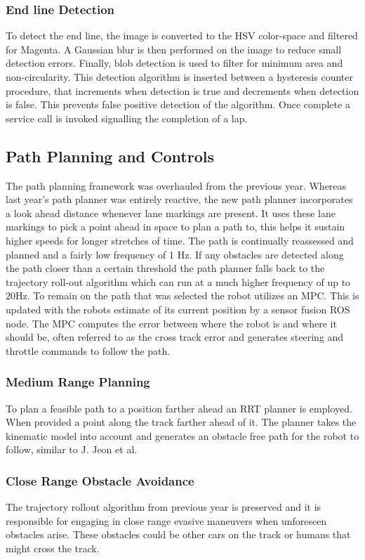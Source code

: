 \documentclass[11pt,journal]{IEEEtran}
\begin{document}
\subsubsection{End line Detection}
To detect the end line, the image is converted to the HSV color-space and filtered for Magenta. A Gaussian blur is then performed on the image to reduce small detection errors. Finally, blob detection is used to filter for minimum area and non-circularity. This detection algorithm is inserted between a hysteresis counter procedure, that increments when detection is true and decrements when detection is false. This prevents false positive detection of the algorithm. Once complete a service call is invoked signalling the completion of a lap.

\subsection{Path Planning and Controls}
The path planning framework was overhauled from the previous year. Whereas last year's path planner was entirely reactive, the new path planner incorporates a look ahead distance whenever lane markings are present. It uses these lane markings to pick a point ahead in space to plan a path to, this helps it sustain higher speeds for longer stretches of time. The path is continually reassessed and planned and a fairly low frequency of 1 Hz. If any obstacles are detected along the path closer than a certain threshold the path planner falls back to the trajectory roll-out algorithm which can run at a much higher frequency of up to 20Hz.
To remain on the path that was selected the robot utilizes an MPC. This is updated with the robots estimate of its current position by a sensor fusion ROS node. The MPC computes the error between where the robot is and where it should be, often referred to as the cross track error and generates steering and throttle commands to follow the path.

\subsubsection{Medium Range Planning}
To plan a feasible path to a position farther ahead an RRT planner is employed. When provided a point along the track farther ahead of it. The planner takes the kinematic model into account and generates an obstacle free path for the robot to follow, similar to J. Jeon et al\cite{RRT}.

\subsubsection{Close Range Obstacle Avoidance}
The trajectory rollout algorithm from previous year is preserved and it is responsible for engaging in close range evasive maneuvers when unforeseen obstacles arise. These obstacles could be other cars on the track or humans that might cross the track.
\end{document}
